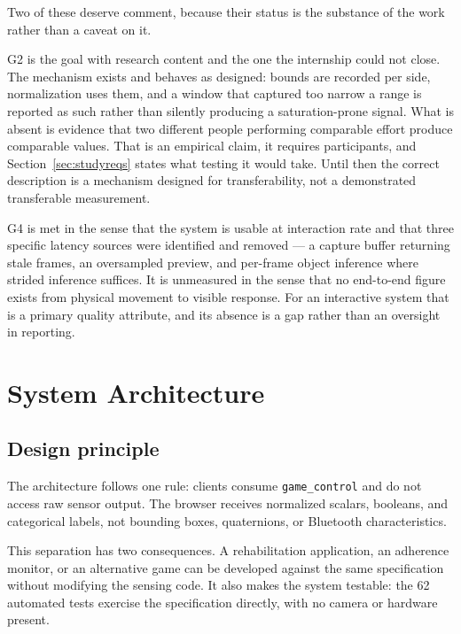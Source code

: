 \documentclass[11pt,a4paper]{article}
\newcommand{\code}[1]{\texttt{\small #1}}
\begin{document}
Two of these deserve comment, because their status is the substance of the
work rather than a caveat on it.

G2 is the goal with research content and the one the internship could not
close. The mechanism exists and behaves as designed: bounds are recorded per
side, normalization uses them, and a window that captured too narrow a range is
reported as such rather than silently producing a saturation-prone signal. What
is absent is evidence that two different people performing comparable effort
produce comparable values. That is an empirical claim, it requires
participants, and Section~\ref{sec:studyreqs} states what testing it would take.
Until then the correct description is a mechanism designed for
transferability, not a demonstrated transferable measurement.

G4 is met in the sense that the system is usable at interaction rate and that
three specific latency sources were identified and removed --- a capture buffer
returning stale frames, an oversampled preview, and per-frame object inference
where strided inference suffices. It is unmeasured in the sense that no
end-to-end figure exists from physical movement to visible response. For an
interactive system that is a primary quality attribute, and its absence is a
gap rather than an oversight in reporting.

\section{System Architecture}
\label{sec:architecture}

\subsection{Design principle}

The architecture follows one rule: clients consume \code{game\_control} and do
not access raw sensor output. The browser receives normalized scalars, booleans,
and categorical labels, not bounding boxes, quaternions, or Bluetooth
characteristics.

This separation has two consequences. A rehabilitation application, an adherence
monitor, or an alternative game can be developed against the same specification
without modifying the sensing code. It also makes the system testable: the 62
automated tests exercise the specification directly, with no camera or hardware
present.
\end{document}
